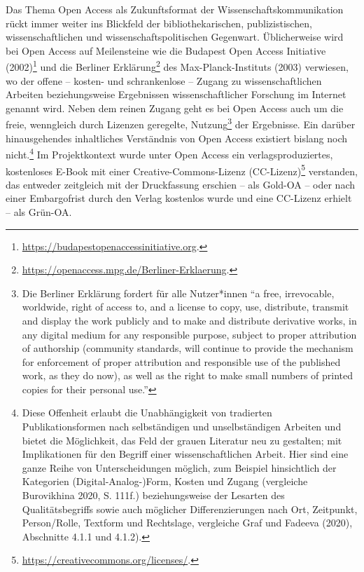\documentclass[a4paper,
fontsize=11pt,
oneside,
numbers=noperiodatend,
parskip=half-,
bibliography=totoc,
final
]{scrartcl}
\begin{document}
Das Thema Open Access als Zukunftsformat der Wissenschaftskommunikation
rückt immer weiter ins Blickfeld der bibliothekarischen,
publizistischen, wissenschaftlichen und wissenschaftspolitischen
Gegenwart. Üblicherweise wird bei Open Access auf Meilensteine wie die
Budapest Open Access Initiative (2002)\footnote{\url{https://budapestopenaccessinitiative.org}.}
und die Berliner Erklärung\footnote{\url{https://openaccess.mpg.de/Berliner-Erklaerung}.}
des Max-Planck-Instituts (2003) verwiesen, wo der offene -- kosten- und
schrankenlose -- Zugang zu wissenschaftlichen Arbeiten beziehungsweise
Ergebnissen wissenschaftlicher Forschung im Internet genannt wird. Neben
dem reinen Zugang geht es bei Open Access auch um die freie, wenngleich
durch Lizenzen geregelte, Nutzung\footnote{Die Berliner Erklärung
  fordert für alle Nutzer*innen ``a free, irrevocable, worldwide, right
  of access to, and a license to copy, use, distribute, transmit and
  display the work publicly and to make and distribute derivative works,
  in any digital medium for any responsible purpose, subject to proper
  attribution of authorship (community standards, will continue to
  provide the mechanism for enforcement of proper attribution and
  responsible use of the published work, as they do now), as well as the
  right to make small numbers of printed copies for their personal
  use.''} der Ergebnisse. Ein darüber hinausgehendes inhaltliches
Verständnis von Open Access existiert bislang noch nicht.\footnote{Diese
  Offenheit erlaubt die Unabhängigkeit von tradierten Publikationsformen
  nach selbständigen und unselbständigen Arbeiten und bietet die
  Möglichkeit, das Feld der grauen Literatur neu zu gestalten; mit
  Implikationen für den Begriff einer wissenschaftlichen Arbeit. Hier
  sind eine ganze Reihe von Unterscheidungen möglich, zum Beispiel
  hinsichtlich der Kategorien (Digital-Analog-)Form, Kosten und Zugang
  (vergleiche Burovikhina 2020, S. 111f.) beziehungsweise der Lesarten
  des Qualitätsbegriffs sowie auch möglicher Differenzierungen nach Ort,
  Zeitpunkt, Person/Rolle, Textform und Rechtslage, vergleiche Graf und
  Fadeeva (2020), Abschnitte 4.1.1 und 4.1.2).} Im Projektkontext wurde
unter Open Access ein verlagsproduziertes, kostenloses E-Book mit einer
Creative-Commons-Lizenz (CC-Lizenz)\footnote{\url{https://creativecommons.org/licenses/}.}
verstanden, das entweder zeitgleich mit der Druckfassung erschien -- als
Gold-OA -- oder nach einer Embargofrist durch den Verlag kostenlos wurde
und eine CC-Lizenz erhielt -- als Grün-OA.
\end{document}
